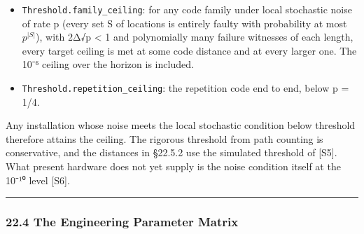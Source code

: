 \documentclass[
]{article}
\providecommand{\tightlist}{%
  \setlength{\itemsep}{0pt}\setlength{\parskip}{0pt}}
\begin{document}
\begin{itemize}
\tightlist
\item
  \texttt{T\allowbreak{}h\allowbreak{}r\allowbreak{}e\allowbreak{}s\allowbreak{}h\allowbreak{}o\allowbreak{}l\allowbreak{}d\allowbreak{}.\allowbreak{}f\allowbreak{}a\allowbreak{}m\allowbreak{}i\allowbreak{}l\allowbreak{}y\allowbreak{}\_\allowbreak{}c\allowbreak{}e\allowbreak{}i\allowbreak{}l\allowbreak{}i\allowbreak{}n\allowbreak{}g}:
  for any code family under local stochastic noise of rate p (every set
  S of locations is entirely faulty with probability at most
  \(p^{\lvert S\rvert}\)), with 2Δ√p \textless{} 1 and polynomially many
  failure witnesses of each length, every target ceiling is met at some
  code distance and at every larger one. The 10⁻⁶ ceiling over the
  horizon is included.
\item
  \texttt{T\allowbreak{}h\allowbreak{}r\allowbreak{}e\allowbreak{}s\allowbreak{}h\allowbreak{}o\allowbreak{}l\allowbreak{}d\allowbreak{}.\allowbreak{}r\allowbreak{}e\allowbreak{}p\allowbreak{}e\allowbreak{}t\allowbreak{}i\allowbreak{}t\allowbreak{}i\allowbreak{}o\allowbreak{}n\allowbreak{}\_\allowbreak{}c\allowbreak{}e\allowbreak{}i\allowbreak{}l\allowbreak{}i\allowbreak{}n\allowbreak{}g}:
  the repetition code end to end, below p = 1/4.
\end{itemize}

Any installation whose noise meets the local stochastic condition below
threshold therefore attains the ceiling. The rigorous threshold from
path counting is conservative, and the distances in §22.5.2 use the
simulated threshold of {[}S5{]}. What present hardware does not yet
supply is the noise condition itself at the 10⁻¹⁰ level {[}S6{]}.

\begin{center}\rule{0.5\linewidth}{0.5pt}\end{center}

\subsubsection{22.4 The Engineering Parameter
Matrix}\label{the-engineering-parameter-matrix}
\end{document}
